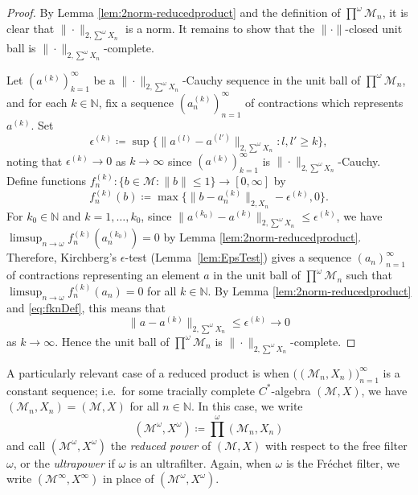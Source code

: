 \documentclass[a4paper,11pt]{amsart}
\theoremstyle{definition}
\numberwithin{equation}{section}
\numberwithin{theorem}{section}
\newcommand{\N}{\mathbb N}
\newcommand{\M}{\mathcal{M}}
\begin{document}
\begin{proof}
By Lemma \ref{lem:2norm-reducedproduct} and the definition of $\prod^\omega \M_n$, it is clear that $\|\cdot\|_{2, \sum^\omega X_n}$ is a norm. It remains to show that the $\|\cdot\|$-closed unit ball is $\|\cdot\|_{2, \sum^\omega X_n}$-complete.

Let $(a^{(k)})_{k=1}^\infty$ be a $\|\cdot\|_{2,\sum^\omega X_n}$-Cauchy sequence in the unit ball of $\prod^\omega\M_n$, and for each $k\in \N$, fix a sequence $(a_n^{(k)})_{n=1}^\infty$ of contractions which represents $a^{(k)}$. Set
\begin{equation}
  \epsilon^{(k)}\coloneqq \sup\big\{\|a^{(l)}-a^{(l')}\|_{2,\sum^\omega X_n}:l,l'\geq k\big\},
\end{equation}
noting that $\epsilon^{(k)}\rightarrow 0$ as $k\rightarrow\infty$ since $(a^{(k)})_{k=1}^\infty$ is $\|\cdot\|_{2,\sum^\omega X_n}$-Cauchy. Define functions $f^{(k)}_n\colon \{ b \in \M : \|b \| \leq 1 \} \rightarrow [0,\infty]$ by
\begin{equation}
\label{eq:fknDef}
  f^{(k)}_n(b) \coloneqq \max\big\{\|b-a^{(k)}_n\|_{2,X_n}-\epsilon^{(k)},0\big\}.
\end{equation}
For $k_0\in \N$ and $k=1,\dots,k_0$, since $\|a^{(k_0)}-a^{(k)}\|_{2,\sum^\omega X_n}\leq \epsilon^{(k)}$, we have $\limsup_{n\rightarrow\omega}f^{(k)}_n(a_n^{(k_0)})=0$ by Lemma \ref{lem:2norm-reducedproduct}.  Therefore, Kirchberg's $\epsilon$-test (Lemma~\ref{lem:EpsTest}) gives a sequence $(a_n)_{n=1}^\infty$ of contractions representing an element $a$ in the unit ball of $\prod^\omega \M_n$ such that $\limsup_{n\rightarrow\omega}f_n^{(k)}(a_n)=0$ for all $k\in \N$. By Lemma \ref{lem:2norm-reducedproduct} and \eqref{eq:fknDef}, this means that
\begin{equation}
  \|a-a^{(k)}\|_{2,\sum^\omega X_n}\leq\epsilon^{(k)}\rightarrow 0
\end{equation}
as $k\rightarrow\infty$. Hence the unit ball of $\prod^\omega\M_n$ is $\|\cdot\|_{2, \sum^\omega X_n}$-complete.
\end{proof}

A particularly relevant case of a reduced product is when $\big( (\M_n, X_n) \big)_{n=1}^\infty$ is a constant sequence; i.e.\ for some tracially complete $C^*$-algebra $(\M, X)$, we have $(\M_n, X_n) = (\M, X)$ for all $n \in \N$. In this case, we write
\begin{equation}
  (\M^\omega, X^\omega) \coloneqq \prod^\omega (\M_n, X_n)
\end{equation}
and call $(\M^\omega, X^\omega)$ the \emph{reduced power} of $(\M, X)$ with respect to the free filter $\omega$, or the \emph{ultrapower} if $\omega$ is an ultrafilter. Again, when $\omega$ is the Fr\'echet filter, we write $(\M^\infty, X^\infty)$ in place of $(\M^\omega, X^\omega)$.  
\end{document}
